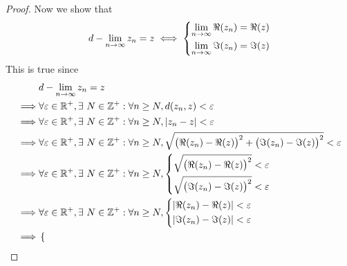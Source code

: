 \begin{proof}
  Now we show that
  \[
    d - \lim_{n \to \infty} z_n = z \iff \begin{dcases}
      \lim_{n \to \infty} \Re(z_n) = \Re(z) \\
      \lim_{n \to \infty} \Im(z_n) = \Im(z)
    \end{dcases}
  \]
  This is true since
  \begin{align*}
             & d - \lim_{n \to \infty} z_n = z                                                                                                                          \\
    \implies & \forall \varepsilon \in \R^+, \exists\ N \in \Z^+ : \forall n \geq N, d(z_n, z) < \varepsilon                                                            \\
    \implies & \forall \varepsilon \in \R^+, \exists\ N \in \Z^+ : \forall n \geq N, \abs{z_n - z} < \varepsilon                                                        \\
    \implies & \forall \varepsilon \in \R^+, \exists\ N \in \Z^+ : \forall n \geq N, \sqrt{\big(\Re(z_n) - \Re(z)\big)^2 + \big(\Im(z_n) - \Im(z)\big)^2} < \varepsilon \\
    \implies & \forall \varepsilon \in \R^+, \exists\ N \in \Z^+ : \forall n \geq N, \begin{dcases}
                                                                                       \sqrt{\big(\Re(z_n) - \Re(z)\big)^2} < \varepsilon \\
                                                                                       \sqrt{\big(\Im(z_n) - \Im(z)\big)^2} < \varepsilon
                                                                                     \end{dcases}                                 \\
    \implies & \forall \varepsilon \in \R^+, \exists\ N \in \Z^+ : \forall n \geq N, \begin{dcases}
                                                                                       \abs{\Re(z_n) - \Re(z)} < \varepsilon \\
                                                                                       \abs{\Im(z_n) - \Im(z)} < \varepsilon
                                                                                     \end{dcases}                                              \\
    \implies & \begin{dcases}

\end{dcases}
\end{align*}
\end{proof}
